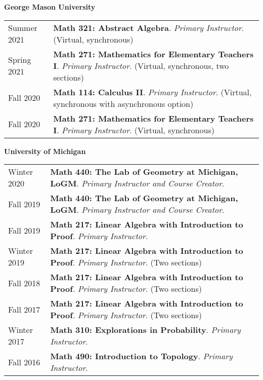 
    \medskip


    \medskip
    \medskip

    \textbf{\large George Mason University}
    
    \begin{center}
    {
    \renewcommand{\arraystretch}{1.2}
    \begin{longtable}{p{}  p{}}
      Summer 2021 & \textbf{{\normalfont Math 321:} Abstract Algebra}. \textit{Primary Instructor}. (Virtual, synchronous) \\ 
  Spring 2021 & \textbf{{\normalfont Math 271:} Mathematics for Elementary Teachers I}. \textit{Primary Instructor}. (Virtual, synchronous, two sections) \\ 
  Fall 2020 & \textbf{{\normalfont Math 114:} Calculus II}. \textit{Primary Instructor}. (Virtual, synchronous with asynchronous option) \\ 
  Fall 2020 & \textbf{{\normalfont Math 271:} Mathematics for Elementary Teachers I}. \textit{Primary Instructor}. (Virtual, synchronous) 
    \end{longtable}
    } 
    \end{center}

    \vspace{-1em}
    


    \textbf{\large University of Michigan}
    
    \begin{center}
    {
    \renewcommand{\arraystretch}{1.2}
    \begin{longtable}{p{}  p{}}
      Winter 2020 & \textbf{{\normalfont Math 440:} The Lab of Geometry at Michigan, LoGM}. \textit{Primary Instructor and Course Creator}.  \\ 
  Fall 2019 & \textbf{{\normalfont Math 440:} The Lab of Geometry at Michigan, LoGM}. \textit{Primary Instructor and Course Creator}.  \\ 
  Fall 2019 & \textbf{{\normalfont Math 217:} Linear Algebra with Introduction to Proof}. \textit{Primary Instructor}.  \\ 
  Winter 2019 & \textbf{{\normalfont Math 217:} Linear Algebra with Introduction to Proof}. \textit{Primary Instructor}. (Two sections) \\ 
  Fall 2018 & \textbf{{\normalfont Math 217:} Linear Algebra with Introduction to Proof}. \textit{Primary Instructor}. (Two sections) \\ 
  Fall 2017 & \textbf{{\normalfont Math 217:} Linear Algebra with Introduction to Proof}. \textit{Primary Instructor}. (Two sections) \\ 
  Winter 2017 & \textbf{{\normalfont Math 310:} Explorations in Probability}. \textit{Primary Instructor}.  \\ 
  Fall 2016 & \textbf{{\normalfont Math 490:} Introduction to Topology}. \textit{Primary Instructor}.  
    \end{longtable}
    } 
    \end{center}

